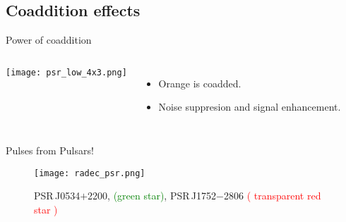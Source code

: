 \subsection {Coaddition effects}
\begin{frame}{Power of coaddition}

\begin{columns}[onlytextwidth]
\texttt{[image: psr\_low\_4x3.png]}
\begin{itemize}
    \item Orange is coadded. 
    \item Noise suppresion and signal enhancement.
\end{itemize}
\end{columns}
\end{frame}

\begin{frame}{Pulses from Pulsars!}
	\begin{figure}
		\centering
		\texttt{[image: radec\_psr.png]}
		\label{fig:fov}
		\caption{PSR\,J0534$+$2200, \textcolor{green}{(green star)}, PSR\,J1752$-$2806 \textcolor{red}{( transparent red star )}}
	\end{figure}
\end{frame}
